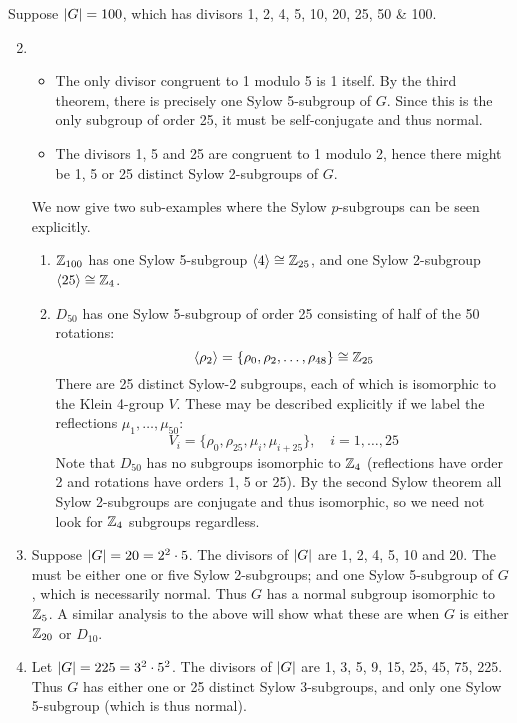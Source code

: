 \begin{examples}{}{}
	\exstart Suppose $\left| G\right|=100$, which has divisors 1, 2, 4, 5, 10, 20, 25, 50 \& 100.
	\begin{enumerate}\setcounter{enumi}{1}
		\item[]\begin{itemize}
			\item The only divisor congruent to 1 modulo 5 is 1 itself. By the third theorem, there is precisely one Sylow 5-subgroup of $G$. Since this is the only subgroup of order 25, it must be self-conjugate and thus normal.
			\item	The divisors 1, 5 and 25 are congruent to 1 modulo 2, hence there might be 1, 5 or 25 distinct Sylow 2-subgroups of $G$.
		\end{itemize}
		We now give two sub-examples where the Sylow $p$-subgroups can be seen explicitly.
		\begin{enumerate}
			\item $\mathbb{Z}_{100}$ has one Sylow 5-subgroup $\left\langle 4\right\rangle\cong\mathbb{Z}_{25}$, and one Sylow 2-subgroup $\left\langle 25\right\rangle\cong\mathbb{Z}_4$.
			\item $D_{50}$ has one Sylow 5-subgroup of order 25 consisting of half of the 50 rotations:
			\[
				\left\langle \rho_2\right\rangle=\{\rho_0,\rho_2,\ldots,\rho_{48}\}\cong\mathbb{Z}_{25}
			\]
			There are 25 distinct Sylow-2 subgroups, each of which is isomorphic to the Klein 4-group $V$. These may be described explicitly if we label the reflections $\mu_1,\ldots,\mu_{50}$:
			\[
				V_i=\{\rho_0,\rho_{25},\mu_i,\mu_{i+25}\},\quad i=1,\ldots,25
			\]
			Note that $D_{50}$ has no subgroups isomorphic to $\mathbb{Z}_4$ (reflections have order 2 and rotations have orders 1, 5 or 25). By the second Sylow theorem all Sylow 2-subgroups are conjugate and thus isomorphic, so we need not look for $\mathbb{Z}_4$ subgroups regardless.
		\end{enumerate}
	
		\item Suppose $\left| G\right|=20=2^2\cdot 5$. The divisors of $\left| G\right|$ are 1, 2, 4, 5, 10 and 20. The must be either one or five Sylow 2-subgroups; and one Sylow 5-subgroup of $G$, which is necessarily normal. Thus $G$ has a normal subgroup isomorphic to $\mathbb{Z}_5$. A similar analysis to the above will show what these are when $G$ is either $\mathbb{Z}_{20}$ or $D_{10}$.
	
		\item Let $\left| G\right|=225=3^2\cdot 5^2$. The divisors of $\left| G\right|$ are 1, 3, 5, 9, 15, 25, 45, 75, 225. Thus $G$ has either one or 25 distinct Sylow 3-subgroups, and only one Sylow 5-subgroup (which is thus normal).
	

\end{enumerate}
\end{examples}
